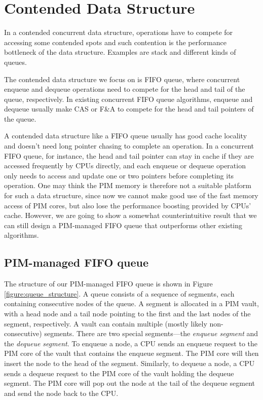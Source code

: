 
\section{Contended Data Structure}
\label{section:contended}
In a contended concurrent data structure, operations have to compete for
accessing some contended spots and
such contention is the performance bottleneck of the data structure.
Examples are stack and different kinds of queues.

The contended data structure we focus on is FIFO queue, where concurrent enqueue
and dequeue operations need to compete for the head and tail of the queue, respectively.
In existing concurrent FIFO queue algorithms, enqueue and dequeue usually
make CAS or F\&A to compete for the head and tail pointers of the queue.

A contended data structure like a FIFO queue usually has good cache locality
and doesn't need long pointer chasing to complete an operation.
In a concurrent FIFO queue, for instance, the head and tail pointer can stay in
cache if they are accessed frequently by CPUs directly, and each enqueue or dequeue
operation only needs to access and update one or two pointers before completing its operation.
One may think the PIM memory is therefore not a suitable platform for such a data structure,
since now we cannot make good use of the fast memory access of PIM cores, but also
lose the performance boosting provided by CPUs' cache.
However, we are going to show a somewhat counterintuitive result that we can still design
a PIM-managed FIFO queue that outperforms other existing algorithms.

\subsection{PIM-managed FIFO queue}
The structure of our PIM-managed FIFO queue is shown in Figure \ref{figure:queue_structure}.
A queue consists of a sequence of segments, each containing consecutive nodes of the queue.
A segment is allocated in a PIM vault, with a head node and a tail node pointing to the first 
and the last nodes of the segment, respectively.
A vault can contain multiple (mostly likely non-consecutive) segments. 
There are two special segments---the \emph{enqueue segment} and the \emph{dequeue segment}.
To enqueue a node, a CPU sends an enqueue request to the PIM core of the vault
that contains the enqueue segment.
The PIM core will then insert the node to the head of the segment.
Similarly, to dequeue a node, a CPU sends a dequeue request to the PIM core of the vault
holding the dequeue segment. 
The PIM core will pop out the node at the tail of the dequeue segment and 
send the node back to the CPU.

